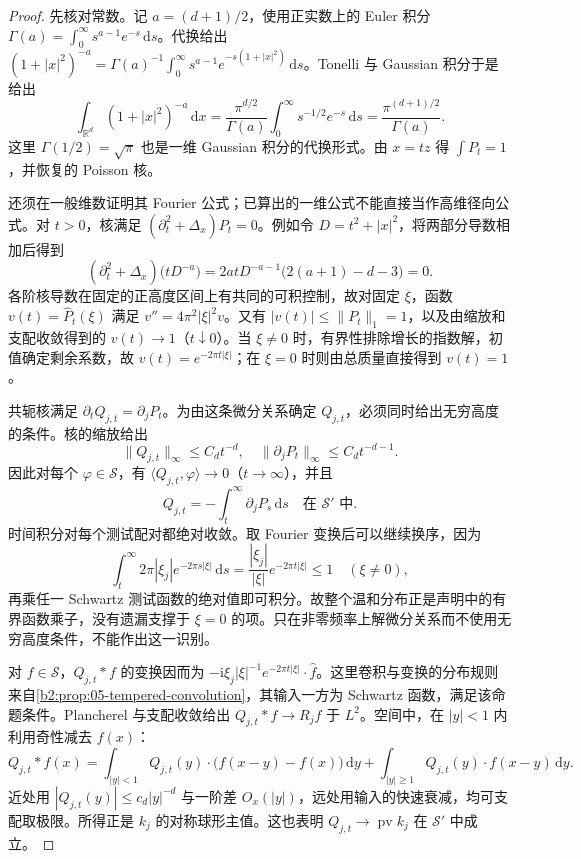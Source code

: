 \begin{proof}
先核对常数。记 \(a=(d+1)/2\)，使用正实数上的 Euler 积分
\(\Gamma(a)=\int_0^\infty s^{a-1}e^{-s}\,\mathrm ds\)。代换给出
\((1+|x|^2)^{-a}=\Gamma(a)^{-1}\int_0^\infty s^{a-1}e^{-s(1+|x|^2)}\,\mathrm ds\)。Tonelli 与 Gaussian 积分于是给出
\[
 \int_{\mathbb R^d}(1+|x|^2)^{-a}\,\mathrm dx
 =\frac{\pi^{d/2}}{\Gamma(a)}
   \int_0^\infty s^{-1/2}e^{-s}\,\mathrm ds
 =\frac{\pi^{(d+1)/2}}{\Gamma(a)}.
\]
这里 \(\Gamma(1/2)=\sqrt\pi\) 也是一维 Gaussian 积分的代换形式。由 \(x=tz\) 得 \(\int P_t=1\)，并恢复的 Poisson 核。

还须在一般维数证明其 Fourier 公式；已算出的一维公式不能直接当作高维径向公式。对 \(t>0\)，核满足 \((\partial_t^2+\Delta_x)P_t=0\)。例如令 \(D=t^2+|x|^2\)，将两部分导数相加后得到
\[
 (\partial_t^2+\Delta_x)\bigl(tD^{-a}\bigr)
 =2atD^{-a-1}\bigl(2(a+1)-d-3\bigr)=0.
\]
各阶核导数在固定的正高度区间上有共同的可积控制，故对固定 \(\xi\)，函数 \(v(t)=\widehat P_t(\xi)\) 满足
\(v''=4\pi^2|\xi|^2v\)。又有 \(|v(t)|\leq\|P_t\|_1=1\)，以及由缩放和支配收敛得到的 \(v(t)\to1\)（\(t\downarrow0\)）。当 \(\xi\ne0\) 时，有界性排除增长的指数解，初值确定剩余系数，故 \(v(t)=e^{-2\pi t|\xi|}\)；在 \(\xi=0\) 时则由总质量直接得到 \(v(t)=1\)。

共轭核满足 \(\partial_tQ_{j,t}=\partial_jP_t\)。为由这条微分关系确定 \(Q_{j,t}\)，必须同时给出无穷高度的条件。核的缩放给出
\[
 \|Q_{j,t}\|_\infty\leq C_dt^{-d},
 \quad\|\partial_jP_t\|_\infty\leq C_dt^{-d-1}.
\]
因此对每个 \(\varphi\in\mathcal S\)，有 \(\langle Q_{j,t},\varphi\rangle\to0\)（\(t\rightarrow\infty\)），并且
\[
 Q_{j,t}=-\int_t^\infty\partial_jP_s\,\mathrm ds
 \quad\text{在 }\mathcal S'\text{ 中}.
\]
时间积分对每个测试配对都绝对收敛。取 Fourier 变换后可以继续换序，因为
\[
 \int_t^\infty2\pi|\xi_j|e^{-2\pi s|\xi|}\,\mathrm ds
 =\frac{|\xi_j|}{|\xi|}e^{-2\pi t|\xi|}\leq1
 \quad(\xi\ne0),
\]
再乘任一 Schwartz 测试函数的绝对值即可积分。故整个温和分布正是声明中的有界函数乘子，没有遗漏支撑于 \(\xi=0\) 的项。只在非零频率上解微分关系而不使用无穷高度条件，不能作出这一识别。

对 \(f\in\mathcal S\)，\(Q_{j,t}*f\) 的变换因而为
\(-\mathrm i\xi_j|\xi|^{-1}e^{-2\pi t|\xi|}\cdot\widehat f\)。这里卷积与变换的分布规则来自\cref{b2:prop:05-tempered-convolution}，其输入一方为 Schwartz 函数，满足该命题条件。Plancherel 与支配收敛给出 \(Q_{j,t}*f\rightarrow R_jf\) 于 \(L^2\)。空间中，在 \(|y|<1\) 内利用奇性减去 \(f(x)\)：
\[
 Q_{j,t}*f(x)
 =\int_{|y|<1}Q_{j,t}(y)\cdot\bigl(f(x-y)-f(x)\bigr)\,\mathrm dy
  +\int_{|y|\geq1}Q_{j,t}(y)\cdot f(x-y)\,\mathrm dy.
\]
近处用 \(|Q_{j,t}(y)|\leq c_d|y|^{-d}\) 与一阶差 \(O_x(|y|)\)，远处用输入的快速衰减，均可支配取极限。所得正是 \(k_j\) 的对称球形主值。这也表明 \(Q_{j,t}\rightarrow\operatorname{pv}k_j\) 在 \(\mathcal S'\) 中成立。


\end{proof}
